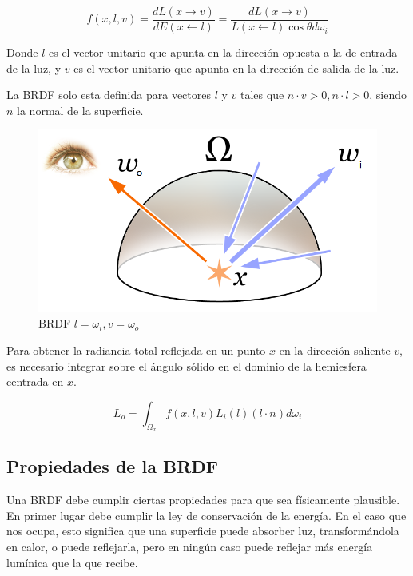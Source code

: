\begin{equation}
f(x, l, v)=\frac{dL(x \to v)}{dE(x \gets l)} = \frac{dL(x \to v)}{L(x \gets l) \cos\theta d\omega_i} 
\end{equation}

Donde $l$ es el vector unitario que apunta en la dirección opuesta a la de entrada de la luz, y $v$ es el vector unitario que apunta en la dirección de salida de la luz.

La BRDF solo esta definida para vectores $l$ y $v$ tales que $n \cdot v > 0, n \cdot l > 0$, siendo $n$ la normal de la superficie.

\begin{figure}[h]
\centering
\includegraphics[scale=0.5]{Rendering_eq.png}
\caption{BRDF $l = \omega_i, v = \omega_o$ \cite{Timrb2008}}
\end{figure}


Para obtener la radiancia total reflejada en un punto $x$ en la dirección saliente $v$, es necesario integrar sobre el ángulo sólido en el dominio de la hemiesfera centrada en $x$.

\begin{equation}
\label{eq:radiance_integral}
L _ o = \int_{\Omega_x} f(x, l, v) L_i(l) (l \cdot n) d\omega_i 
\end{equation}

\clearpage

\subsection{Propiedades de la BRDF}

Una BRDF debe cumplir ciertas propiedades para que sea físicamente plausible.
En primer lugar debe cumplir la ley de conservación de la energía. En el caso que nos ocupa, esto significa que una superficie puede absorber luz, transformándola en calor, o puede reflejarla, pero en ningún caso puede reflejar más energía lumínica que la que recibe.

